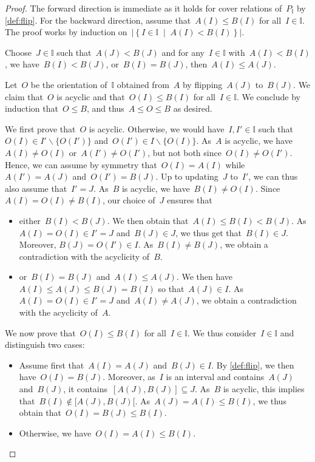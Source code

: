 \documentclass[reqno]{amsart}
\theoremstyle{definition}
\newcommand{\I}{\mathbb{I}} %
\newcommand{\set}[2]{\left\{ #1 \;\middle|\; #2 \right\}} %
\newcommand{\ssm}{\smallsetminus} %
\newcommand{\II}{\mathbb I} %
\begin{document}
\begin{proof}
The forward direction is immediate as it holds for cover relations of~$P_\II$ by \cref{def:flip}.
For the backward direction, assume that~$A(I) \le B(I)$ for all~$I \in \II$.
The proof works by induction on~$|\set{I \in \II}{A(I) < B(I)}|$.

Choose~$J \in \II$ such that~$A(J) < B(J)$ and for any~$I \in \II$ with~$A(I) < B(I)$, we have~$B(I) < B(J)$, or~$B(I) = B(J)$, then~$A(I) \le A(J)$.

Let~$O$ be the orientation of~$\I$ obtained from~$A$ by flipping~$A(J)$ to~$B(J)$.
We claim that~$O$ is acyclic and that~$O(I) \le B(I)$ for all~$I \in \II$. 
We conclude by induction that~$O \le B$, and thus~$A \le O \le B$ as desired.

We first prove that~$O$ is acyclic.
Otherwise, we would have~$I,I' \in \II$ such that~$O(I) \in I' \ssm \{O(I')\}$ and~$O(I') \in I \ssm \{O(I)\}$.
As~$A$ is acyclic, we have~$A(I) \ne O(I)$ or~$A(I') \ne O(I')$, but not both since~$O(I) \ne O(I')$.
Hence, we can assume by symmetry that~$O(I) = A(I)$ while~$A(I') = A(J)$ and~$O(I') = B(J)$.
Up to updating~$J$ to~$I'$, we can thus also assume that~$I' = J$.
As~$B$ is acyclic, we have~$B(I) \ne O(I)$.
Since~$A(I) = O(I) \ne B(I)$, our choice of~$J$ ensures that
\begin{itemize}
\item either~$B(I) < B(J)$. 
We then obtain that~$A(I) \le B(I) < B(J)$.
As~$A(I) = O(I) \in I' = J$ and~$B(J) \in J$, we thus get that~$B(I) \in J$.
Moreover, $B(J) = O(I') \in I$.
As~$B(I) \ne B(J)$, we obtain a contradiction with the acyclicity of~$B$.
\item or~$B(I) = B(J)$ and~$A(I) \le A(J)$.
We then have~$A(I) \le A(J) \le B(J) = B(I)$ so that~$A(J) \in I$.
As~$A(I) = O(I) \in I' = J$ and~$A(I) \ne A(J)$, we obtain a contradiction with the acyclicity of~$A$.
\end{itemize}

We now prove that~$O(I) \le B(I)$ for all~$I \in \II$.
We thus consider~$I \in \II$ and distinguish two cases:
\begin{itemize}
\item Assume first that~$A(I) = A(J)$ and~$B(J) \in I$. By \cref{def:flip}, we then have~${O(I) = B(J)}$. Moreover, as~$I$ is an interval and contains~$A(J)$ and~$B(J)$, it contains~$[A(J), B(J)] \subseteq J$. As~$B$ is acyclic, this implies that~$B(I) \notin {[A(J), B(J)[}$. As~$A(J) = A(I) \le B(I)$, we thus obtain that~$O(I) = B(J) \le B(I)$.
\item Otherwise, we have~$O(I) = A(I) \le B(I)$.
\qedhere
\end{itemize}
\end{proof}
\end{document}
